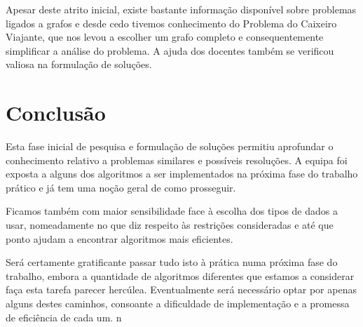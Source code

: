\documentclass[12pt,a4paper,reqno]{report}
\numberwithin{equation}{section}
\begin{document}
Apesar deste atrito inicial, existe bastante informação disponível sobre problemas ligados a grafos e desde cedo tivemos conhecimento do Problema do Caixeiro Viajante, que nos levou a escolher um grafo completo e consequentemente simplificar a análise do problema. A ajuda dos docentes também se verificou valiosa na formulação de soluções.

\chapter{Conclusão}

Esta fase inicial de pesquisa e formulação de soluções permitiu aprofundar o conhecimento relativo a problemas similares e possíveis resoluções. A equipa foi exposta a alguns dos algoritmos a ser implementados na próxima fase do trabalho prático e já tem uma noção geral de como prosseguir.

Ficamos também com maior sensibilidade face à escolha dos tipos de dados a usar, nomeadamente no que diz respeito às restrições consideradas e até que ponto ajudam a encontrar algoritmos mais eficientes.

Será certamente gratificante passar tudo isto à prática numa próxima fase do trabalho, embora a quantidade de algoritmos diferentes que estamos a considerar faça esta tarefa parecer hercúlea. Eventualmente será necessário optar por apenas alguns destes caminhos, consoante a dificuldade de implementação e a promessa de eficiência de cada um. n



\end{document}
